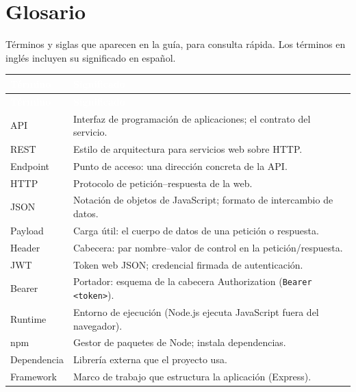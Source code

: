 \documentclass[11pt]{article}
\begin{document}
\section{Glosario}
Términos y siglas que aparecen en la guía, para consulta rápida. Los términos en inglés incluyen su significado en español.

{\renewcommand{\arraystretch}{1.25}
\begin{longtable}{>{\raggedright\arraybackslash}p{3.2cm} >{\raggedright\arraybackslash}p{12.2cm}}
\rowcolor{ndverde}\textcolor{white}{\textbf{Término}} & \textcolor{white}{\textbf{Significado}} \\
\endfirsthead
\rowcolor{ndverde}\textcolor{white}{\textbf{Término}} & \textcolor{white}{\textbf{Significado}} \\
\endhead
\ttfamily\color{ndverde}API & Interfaz de programación de aplicaciones; el contrato del servicio. \\ \hline
\ttfamily\color{ndverde}REST & Estilo de arquitectura para servicios web sobre HTTP. \\ \hline
\ttfamily\color{ndverde}Endpoint & Punto de acceso: una dirección concreta de la API. \\ \hline
\ttfamily\color{ndverde}HTTP & Protocolo de petición--respuesta de la web. \\ \hline
\ttfamily\color{ndverde}JSON & Notación de objetos de JavaScript; formato de intercambio de datos. \\ \hline
\ttfamily\color{ndverde}Payload & Carga útil: el cuerpo de datos de una petición o respuesta. \\ \hline
\ttfamily\color{ndverde}Header & Cabecera: par nombre--valor de control en la petición/respuesta. \\ \hline
\ttfamily\color{ndverde}JWT & Token web JSON; credencial firmada de autenticación. \\ \hline
\ttfamily\color{ndverde}Bearer & Portador: esquema de la cabecera Authorization (\texttt{Bearer <token>}). \\ \hline
\ttfamily\color{ndverde}Runtime & Entorno de ejecución (Node.js ejecuta JavaScript fuera del navegador). \\ \hline
\ttfamily\color{ndverde}npm & Gestor de paquetes de Node; instala dependencias. \\ \hline
\ttfamily\color{ndverde}Dependencia & Librería externa que el proyecto usa. \\ \hline
\ttfamily\color{ndverde}Framework & Marco de trabajo que estructura la aplicación (Express). \\ \hline

\end{longtable}}
\end{document}
